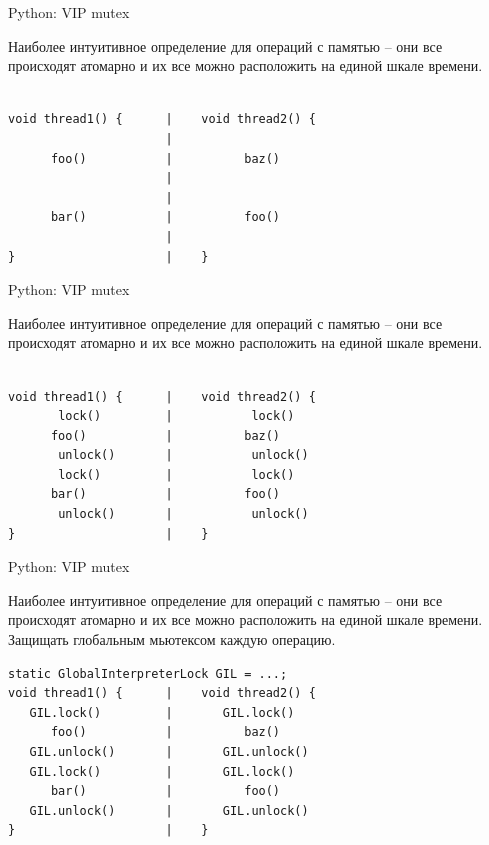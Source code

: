 \begin{frame}{Python: VIP mutex}

Наиболее интуитивное определение для операций с памятью -- они все происходят атомарно и их все можно расположить на единой шкале времени.


\begin{lstlisting}

void thread1() {      |    void thread2() {                                   
                      |
      foo()           |          baz()                           
                      |
                      |
      bar()           |          foo()                           
                      |
}                     |    }                    
\end{lstlisting}
\end{frame}

\begin{frame}{Python: VIP mutex}

Наиболее интуитивное определение для операций с памятью -- они все происходят атомарно и их все можно расположить на единой шкале времени.

\begin{lstlisting}

void thread1() {      |    void thread2() {                                   
       lock()         |           lock()
      foo()           |          baz()                           
       unlock()       |           unlock()
       lock()         |           lock()
      bar()           |          foo()                           
       unlock()       |           unlock()
}                     |    }                    
\end{lstlisting}	

\end{frame}

\begin{frame}{Python: VIP mutex}

Наиболее интуитивное определение для операций с памятью -- они все происходят атомарно и их все можно расположить на единой шкале времени.
Защищать глобальным мьютексом каждую операцию.

\begin{lstlisting}
static GlobalInterpreterLock GIL = ...;
void thread1() {      |    void thread2() {                                   
   GIL.lock()         |       GIL.lock()
      foo()           |          baz()                           
   GIL.unlock()       |       GIL.unlock()
   GIL.lock()         |       GIL.lock()
      bar()           |          foo()                           
   GIL.unlock()       |       GIL.unlock()
}                     |    }                    
\end{lstlisting}	

\end{frame}

